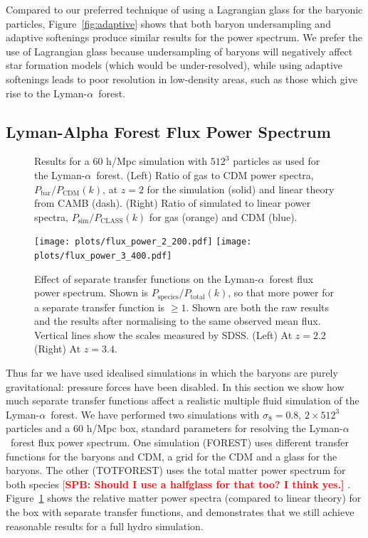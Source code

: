 \documentclass[a4paper,11pt]{article}
\newcommand{\Lya}{Lyman-$\alpha$}
\newcommand{\spb}[1]{\textcolor{red}{[\bf SPB: #1]} }
\begin{document}
Compared to our preferred technique of using a Lagrangian glass for the baryonic particles, Figure~\ref{fig:adaptive} shows that both baryon undersampling and adaptive softenings produce similar results for the power spectrum. We prefer the use of Lagrangian glass because undersampling of baryons will negatively affect star formation models (which would be under-resolved), while using adaptive softenings leads to poor resolution in low-density areas, such as those which give rise to the \Lya~forest.

\subsection{Lyman-Alpha Forest Flux Power Spectrum}

\begin{figure}
\caption{Results for a $60$ h/Mpc simulation with $512^3$ particles as used for the \Lya~forest. (Left) Ratio of gas to CDM power spectra, $P_\mathrm{bar}/P_\mathrm{CDM}(k)$, at $z=2$ for the simulation (solid) and linear theory from CAMB (dash). (Right) Ratio of simulated to linear power spectra, $P_\mathrm{sim}/P_\mathrm{CLASS}(k)$ for gas (orange) and CDM (blue).}
\label{fig:lyamatter}
\end{figure}

\begin{figure}
\texttt{[image: plots/flux\_power\_2\_200.pdf]}
\texttt{[image: plots/flux\_power\_3\_400.pdf]}
\caption{Effect of separate transfer functions on the \Lya~forest flux power spectrum. Shown is $P_\mathrm{species}/P_\mathrm{total}(k)$, so that more power for a separate transfer function is $\geq 1$. Shown are both the raw results and the results after normalising to the same observed mean flux. Vertical lines show the scales measured by SDSS.
(Left) At $z=2.2$ (Right) At $z=3.4$. }
\label{fig:lyaflux}
\end{figure}

Thus far we have used idealised simulations in which the baryons are purely gravitational: pressure forces have been disabled. In this section we show how much separate transfer functions affect a realistic multiple fluid simulation of the \Lya~forest. We have performed two simulations with $\sigma_8 = 0.8$, $2\times 512^3$ particles and a $60$ h/Mpc box, standard parameters for resolving the \Lya~forest flux power spectrum. One simulation (FOREST) uses different transfer functions for the baryons and CDM, a grid for the CDM and a glass for the baryons. The other (TOTFOREST) uses the total matter power spectrum for both species \spb{Should I use a halfglass for that too? I think yes.}. Figure~\ref{fig:lyamatter} shows the relative matter power spectra (compared to linear theory) for the box with separate transfer functions, and demonstrates that we still achieve reasonable results for a full hydro simulation.
\end{document}
